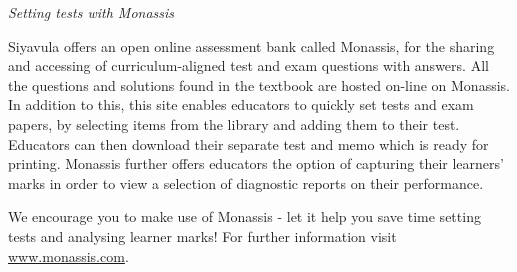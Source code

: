 
{\normalfont\sffamily\fontsize{22}\normalfont\itshape Setting tests with Monassis} \par

{\Large
Siyavula offers an open online assessment bank called Monassis, for the sharing and accessing of
curriculum-aligned test and exam questions with answers. All the questions and solutions found in the
textbook are hosted on-line on Monassis. In addition to this, this site enables educators to quickly set tests
and exam papers, by selecting items from the library and adding them to their test. Educators can then
download their separate test and memo which is ready for printing. Monassis further offers educators the
option of capturing their learners' marks in order to view a selection of diagnostic reports on their
performance.
\begin{figure}[H]
\begin{center}
\end{center}
\end{figure}




We encourage you to make use of Monassis - let it help you save time setting tests and analysing learner marks! For further information visit \underline{www.monassis.com}.\par






}
